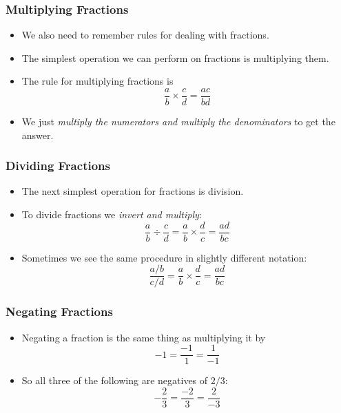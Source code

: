 \documentclass[serif,ignorenonframetext]{beamer}
\begin{document}
\begin{frame}
  \frametitle{Multiplying Fractions}
  \begin{itemize}[<+->]
  \item We also need to remember rules for dealing with fractions.
  \item The simplest operation we can perform on fractions is
    multiplying them.
  \item The rule for multiplying fractions is
    \begin{equation*}
      \frac{a}{b} \times \frac{c}{d} = \frac{ac}{bd}
    \end{equation*}
  \item We just \textit{multiply the numerators and multiply the
    denominators} to get the answer.
  \end{itemize}
\end{frame}

\begin{frame}
  \frametitle{Dividing Fractions}
  \begin{itemize}[<+->]
  \item The next simplest operation for fractions is division.
  \item To divide fractions we \textit{invert and multiply}:
    \begin{equation*}
      \frac{a}{b} \div \frac{c}{d} = \frac{a}{b} \times \frac{d}{c}
      = \frac{ad}{bc}
    \end{equation*}
  \item Sometimes we see the same procedure in slightly different
    notation:
    \begin{equation*}
      \frac{a/b}{c/d} = \frac{a}{b} \times \frac{d}{c} = \frac{ad}{bc}
    \end{equation*}
  \end{itemize}
\end{frame}

\begin{frame}
  \frametitle{Negating Fractions}
  \begin{itemize}[<+->]
  \item Negating a fraction is the same thing as multiplying it by
    \begin{equation*}
      -1 = \frac{-1}{1} = \frac{1}{-1}
    \end{equation*}
  \item So all three of the following are negatives of $2/3$:
    \begin{equation*}
      -\frac{2}{3} = \frac{-2}{3} = \frac{2}{-3}
    \end{equation*}
  \end{itemize}
\end{frame}
\end{document}
